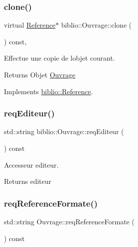 \subsubsection{\texorpdfstring{clone()}{clone()}}
{\footnotesize\ttfamily virtual \hyperlink{classbiblio_1_1Reference}{Reference}$\ast$ biblio\+::\+Ouvrage\+::clone (\begin{DoxyParamCaption}{ }\end{DoxyParamCaption}) const\hspace{0.3cm}{\ttfamily [inline]}, {\ttfamily [virtual]}}



Effectue une copie de l\textquotesingle{}objet courant. 

\begin{DoxyReturn}{Returns}
Objet \hyperlink{classbiblio_1_1Ouvrage}{Ouvrage} 
\end{DoxyReturn}


Implements \hyperlink{classbiblio_1_1Reference}{biblio\+::\+Reference}.

\mbox{\label{classbiblio_1_1Ouvrage_a79ed5a4c5eb760f892826c754f15b64b}} 
\subsubsection{\texorpdfstring{req\+Editeur()}{reqEditeur()}}
{\footnotesize\ttfamily std\+::string biblio\+::\+Ouvrage\+::req\+Editeur (\begin{DoxyParamCaption}{ }\end{DoxyParamCaption}) const\hspace{0.3cm}{\ttfamily [inline]}}



Accesseur editeur. 

\begin{DoxyReturn}{Returns}
editeur 
\end{DoxyReturn}
\mbox{\label{classbiblio_1_1Ouvrage_a7bbeb2555e634b63cb4566084014dc0d}} 
\subsubsection{\texorpdfstring{req\+Reference\+Formate()}{reqReferenceFormate()}}
{\footnotesize\ttfamily std\+::string Ouvrage\+::req\+Reference\+Formate (\begin{DoxyParamCaption}{ }\end{DoxyParamCaption}) const\hspace{0.3cm}{\ttfamily [virtual]}}



